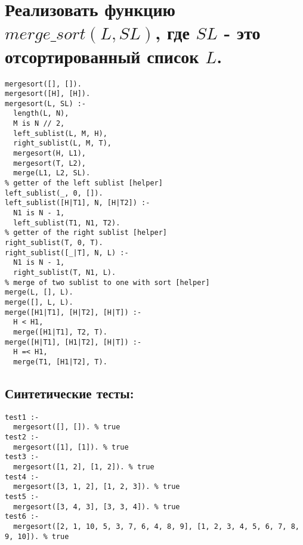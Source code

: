\documentclass[a4paper,12pt]{extreport}
\begin{document}
  \chapter{Реализовать функцию $merge\_sort(L, SL)$, где $SL$ - это отсортированный список $L$.}\par
  \begin{lstlisting}[caption=merge\_sort(L{,} SL) realization, style=customProlog]
mergesort([], []).
mergesort([H], [H]).
mergesort(L, SL) :-
  length(L, N),
  M is N // 2,
  left_sublist(L, M, H),
  right_sublist(L, M, T),
  mergesort(H, L1),
  mergesort(T, L2),
  merge(L1, L2, SL).
% getter of the left sublist [helper]
left_sublist(_, 0, []).
left_sublist([H|T1], N, [H|T2]) :-
  N1 is N - 1,
  left_sublist(T1, N1, T2).
% getter of the right sublist [helper]
right_sublist(T, 0, T).
right_sublist([_|T], N, L) :-
  N1 is N - 1,
  right_sublist(T, N1, L).
% merge of two sublist to one with sort [helper]
merge(L, [], L).
merge([], L, L).
merge([H1|T1], [H|T2], [H|T]) :-
  H < H1,
  merge([H1|T1], T2, T).
merge([H|T1], [H1|T2], [H|T]) :-
  H =< H1,
  merge(T1, [H1|T2], T).
  \end{lstlisting}
  \section{Синтетические тесты:}\par
  \begin{lstlisting}[caption=merge\_sort(L{,} SL) tests, style=customProlog]
test1 :-
  mergesort([], []). % true
test2 :-
  mergesort([1], [1]). % true
test3 :-
  mergesort([1, 2], [1, 2]). % true
test4 :-
  mergesort([3, 1, 2], [1, 2, 3]). % true
test5 :-
  mergesort([3, 4, 3], [3, 3, 4]). % true
test6 :-
  mergesort([2, 1, 10, 5, 3, 7, 6, 4, 8, 9], [1, 2, 3, 4, 5, 6, 7, 8, 9, 10]). % true
  \end{lstlisting}
\end{document}
